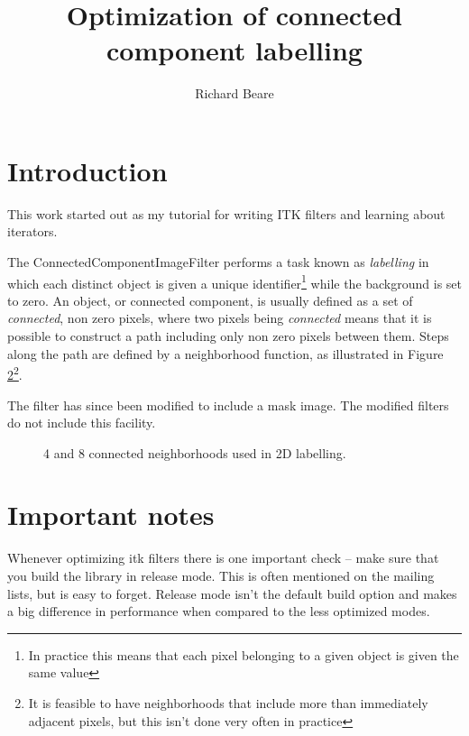 \documentclass[IJ]{cesj}
\author{Richard Beare}
\institute{Department of Medicine, Monash University, Australia}
\title{Optimization of connected component labelling}
\begin{document}
\lstset{language=c++}
\maketitle
\section{Introduction}
This work started out as my tutorial for writing ITK filters and
learning about iterators. 

The ConnectedComponentImageFilter performs a task known as {\em
labelling} in which each distinct object is given a unique
identifier\footnote{In practice this means that each pixel belonging
to a given object is given the same value} while the background is set
to zero. An object, or connected component, is usually defined as a
set of {\em connected}, non zero pixels, where two pixels being {\em
connected} means that it is possible to construct a path including
only non zero pixels between them. Steps along the path are defined by
a neighborhood function, as illustrated in Figure \ref{}\footnote{It
is feasible to have neighborhoods that include more than immediately
adjacent pixels, but this isn't done very often in practice}.

The filter has since been modified to include a mask image. The
modified filters do not include this facility.

\begin{figure}[htbp]
\begin{center}
\label{fig:neigh}
\caption{4 and 8 connected neighborhoods used in 2D labelling.}
\end{center}
\end{figure}

\section{Important notes}
Whenever optimizing itk filters there is one important check -- make
sure that you build the library in release mode. This is often
mentioned on the mailing lists, but is easy to forget. Release mode
isn't the default build option and makes a big difference in
performance when compared to the less optimized modes.
\end{document}
